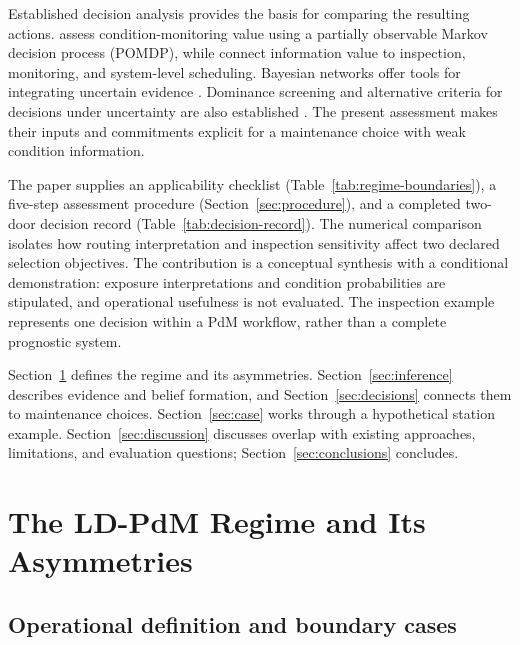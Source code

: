 \documentclass[symmetry,article,submit,pdftex,oneauthor]{Definitions/mdpi}
\begin{document}
Established decision analysis provides the basis for comparing the resulting actions. \citet{SrinivasanParlikad2013VoCM} assess condition-monitoring value using a partially observable Markov decision process (POMDP), while \citet{MemarzadehPozzi2016VoI} connect information value to inspection, monitoring, and system-level scheduling. Bayesian networks offer tools for integrating uncertain evidence \citep{Kabir2019154}. Dominance screening and alternative criteria for decisions under uncertainty are also established \citep{Troffaes2007ImpreciseDecisions}. The present assessment makes their inputs and commitments explicit for a maintenance choice with weak condition information.

The paper supplies an applicability checklist (Table~\ref{tab:regime-boundaries}), a five-step assessment procedure (Section~\ref{sec:procedure}), and a completed two-door decision record (Table~\ref{tab:decision-record}). The numerical comparison isolates how routing interpretation and inspection sensitivity affect two declared selection objectives. The contribution is a conceptual synthesis with a conditional demonstration: exposure interpretations and condition probabilities are stipulated, and operational usefulness is not evaluated. The inspection example represents one decision within a PdM workflow, rather than a complete prognostic system.

Section~\ref{sec:asymmetries} defines the regime and its asymmetries. Section~\ref{sec:inference} describes evidence and belief formation, and Section~\ref{sec:decisions} connects them to maintenance choices. Section~\ref{sec:case} works through a hypothetical station example. Section~\ref{sec:discussion} discusses overlap with existing approaches, limitations, and evaluation questions; Section~\ref{sec:conclusions} concludes.

\section{The LD-PdM Regime and Its Asymmetries}
\label{sec:asymmetries}

\subsection{Operational definition and boundary cases}
\end{document}
